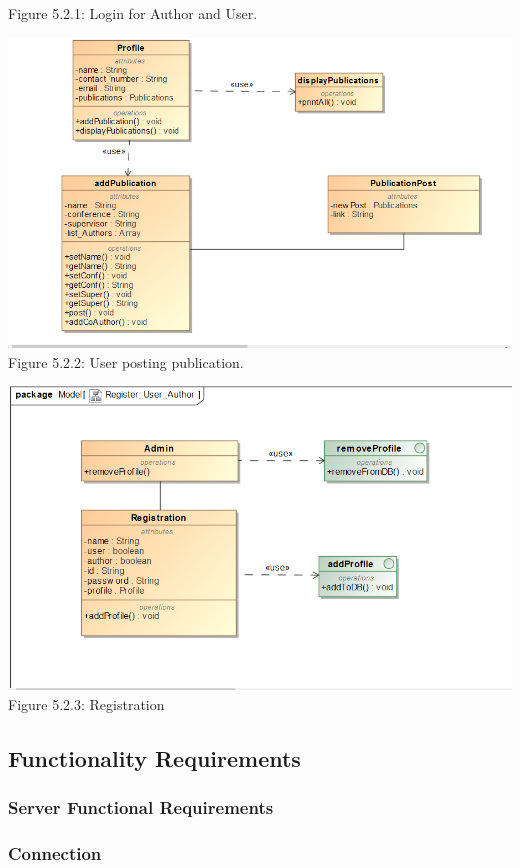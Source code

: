 \documentclass[hidelinks,a4paper,12pt]{article}
\begin{document}
	Figure 5.2.1: Login for Author and User.
	
	\includegraphics[width=1\textwidth]{./Graphs/Posting.png}\\[0.4cm]  
	
	Figure 5.2.2: User posting publication.
	
	
	\includegraphics[width=1\textwidth]{./Graphs/Registration.png}\\[0.4cm]  
	Figure 5.2.3: Registration
	
	\subsection{Functionality Requirements}
	\subsubsection{Server Functional Requirements}
	
	\subsubsection{Connection}
	
\end{document}
